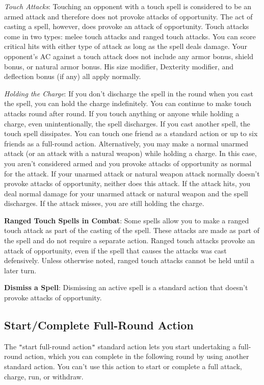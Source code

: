 \textit{Touch Attacks}: Touching an opponent with a touch spell is considered to be an armed attack and therefore does not provoke attacks of opportunity. The act of casting a spell, however, does provoke an attack of opportunity. Touch attacks come in two types: melee touch attacks and ranged touch attacks. You can score critical hits with either type of attack as long as the spell deals damage. Your opponent's AC against a touch attack does not include any armor bonus, shield bonus, or natural armor bonus. His size modifier, Dexterity modifier, and deflection bonus (if any) all apply normally.
				
\textit{Holding the Charge}: If you don't discharge the spell in the round when you cast the spell, you can hold the charge indefinitely. You can continue to make touch attacks round after round. If you touch anything or anyone while holding a charge, even unintentionally, the spell discharges. If you cast another spell, the touch spell dissipates. You can touch one friend as a standard action or up to six friends as a full-round action. Alternatively, you may make a normal unarmed attack (or an attack with a natural weapon) while holding a charge. In this case, you aren't considered armed and you provoke attacks of opportunity as normal for the attack. If your unarmed attack or natural weapon attack normally doesn't provoke attacks of opportunity, neither does this attack. If the attack hits, you deal normal damage for your unarmed attack or natural weapon and the spell discharges. If the attack misses, you are still holding the charge.
				
\textbf{Ranged Touch Spells in Combat}: Some spells allow you to make a ranged touch attack as part of the casting of the spell. These attacks are made as part of the spell and do not require a separate action. Ranged touch attacks provoke an attack of opportunity, even if the spell that causes the attacks was cast defensively. Unless otherwise noted, ranged touch attacks cannot be held until a later turn. 
				
\textbf{Dismiss a Spell}: Dismissing an active spell is a standard action that doesn't provoke attacks of opportunity.
				
\subsection{Start/Complete Full-Round Action}

				
The \texttt{{}"{}}start full-round action\texttt{{}"{}} standard action lets you start undertaking a full-round action, which you can complete in the following round by using another standard action. You can't use this action to start or complete a full attack, charge, run, or withdraw.
				
